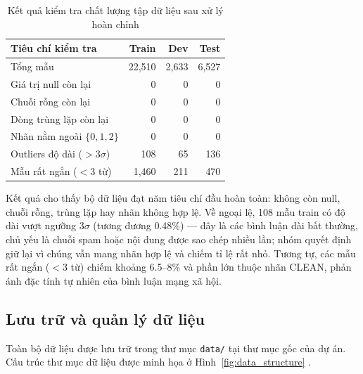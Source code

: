 \begin{table}[H]
    \centering
    \caption{Kết quả kiểm tra chất lượng tập dữ liệu sau xử lý hoàn chỉnh}
    \label{tab:qa_result}
    \begin{tabular}{lrrr}
        \hline
        \textbf{Tiêu chí kiểm tra}    & \textbf{Train} & \textbf{Dev} & \textbf{Test} \\
        \hline
        Tổng mẫu                      & 22,510         & 2,633        & 6,527         \\
        Giá trị null còn lại          & 0              & 0            & 0             \\
        Chuỗi rỗng còn lại            & 0              & 0            & 0             \\
        Dòng trùng lặp còn lại        & 0              & 0            & 0             \\
        Nhãn nằm ngoài $\{0, 1, 2\}$  & 0              & 0            & 0             \\
        Outliers độ dài ($> 3\sigma$) & 108            & 65           & 136           \\
        Mẫu rất ngắn ($< 3$ từ)       & 1,460          & 211          & 470           \\
        \hline
    \end{tabular}
\end{table}

Kết quả cho thấy bộ dữ liệu đạt năm tiêu chí đầu hoàn toàn: không còn null, chuỗi rỗng, trùng lặp hay nhãn không hợp lệ. Về ngoại lệ, 108 mẫu train có độ dài vượt ngưỡng $3\sigma$ (tương đương 0.48\%) — đây là các bình luận dài bất thường, chủ yếu là chuỗi spam hoặc nội dung được sao chép nhiều lần; nhóm quyết định giữ lại vì chúng vẫn mang nhãn hợp lệ và chiếm tỉ lệ rất nhỏ. Tương tự, các mẫu rất ngắn ($< 3$ từ) chiếm khoảng 6.5--8\% và phần lớn thuộc nhãn CLEAN, phản ánh đặc tính tự nhiên của bình luận mạng xã hội.

\subsection{Lưu trữ và quản lý dữ liệu}

Toàn bộ dữ liệu được lưu trữ trong thư mục \texttt{data/} tại thư mục gốc của dự án. Cấu trúc thư mục dữ liệu được minh họa ở Hình~\ref{fig:data_structure} .

